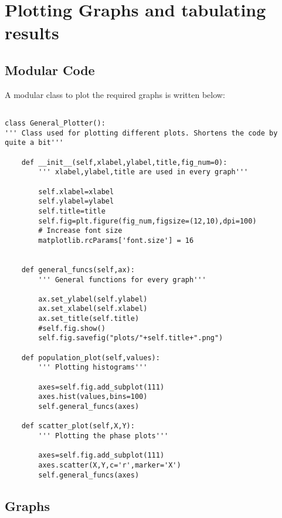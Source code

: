\documentclass{article}
\begin{document}
\section{Plotting Graphs and tabulating results }
\subsection{Modular Code}

A modular class to plot the required graphs is written below:

\begin{lstlisting}

class General_Plotter():
''' Class used for plotting different plots. Shortens the code by quite a bit'''
    
    def __init__(self,xlabel,ylabel,title,fig_num=0):
        ''' xlabel,ylabel,title are used in every graph''' 

        self.xlabel=xlabel
        self.ylabel=ylabel
        self.title=title
        self.fig=plt.figure(fig_num,figsize=(12,10),dpi=100)
        # Increase font size
        matplotlib.rcParams['font.size'] = 16

    
    def general_funcs(self,ax):
        ''' General functions for every graph'''
        
        ax.set_ylabel(self.ylabel)
        ax.set_xlabel(self.xlabel)
        ax.set_title(self.title)
        #self.fig.show()
        self.fig.savefig("plots/"+self.title+".png")

    def population_plot(self,values):
        ''' Plotting histograms'''

        axes=self.fig.add_subplot(111)
        axes.hist(values,bins=100)
        self.general_funcs(axes)

    def scatter_plot(self,X,Y):
        ''' Plotting the phase plots'''

        axes=self.fig.add_subplot(111)
        axes.scatter(X,Y,c='r',marker='X')
        self.general_funcs(axes)

\end{lstlisting}
\subsection{Graphs}
\end{document}
